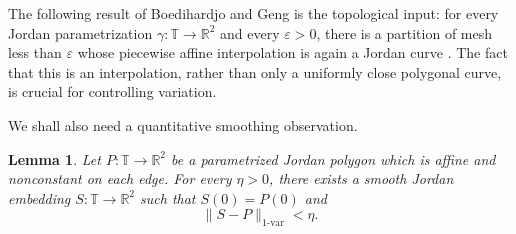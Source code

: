 \documentclass[11pt,reqno]{amsart}
\newtheorem{lemma}[theorem]{Lemma}
\theoremstyle{definition}
\theoremstyle{remark}
\newcommand{\R}{\mathbb{R}}
\newcommand{\T}{\mathbb{T}}
\begin{document}
 The following result of
Boedihardjo and Geng is the topological input: for every Jordan
parametrization \(\gamma\colon\T\to\R^2\) and every \(\varepsilon>0\), there
is a partition of mesh less than \(\varepsilon\) whose piecewise affine
interpolation is again a Jordan curve \cite[Theorem~2.2]{BoedihardjoGeng2015}.
The fact that this is an interpolation, rather than only a uniformly close
polygonal curve, is crucial for controlling variation.

We shall also need a quantitative smoothing observation.

\begin{lemma}\label{lem:smooth-polygon}
Let \(P\colon\T\to\R^2\) be a parametrized Jordan polygon which is affine and
nonconstant on each edge.  For every \(\eta>0\), there exists a smooth Jordan
embedding \(S\colon\T\to\R^2\) such that \(S(0)=P(0)\) and
\begin{equation}\label{eq:w11-smooth}
 \lVert S-P\rVert_{1\text{-var}}<\eta.
\end{equation}
\end{lemma}
\end{document}
